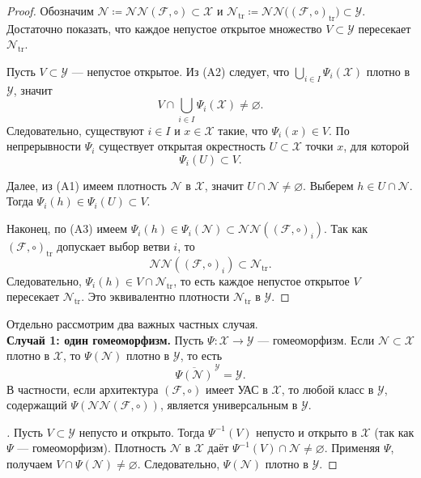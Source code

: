 \documentclass[../NDCNNAI_main.tex]{subfiles}
\begin{document}
\begin{proof}
Обозначим $\mathcal{N}\coloneq\mathcal{NN}(\mathcal{F},\circ)\subset\mathcal{X}$ и
$\mathcal{N}_{\mathrm{tr}}\coloneq\mathcal{NN}\bigl((\mathcal{F},\circ)_{\mathrm{tr}}\bigr)\subset\mathcal{Y}$.
Достаточно показать, что каждое непустое открытое множество $V\subset\mathcal{Y}$
пересекает $\mathcal{N}_{\mathrm{tr}}$.

Пусть $V\subset\mathcal{Y}$ --- непустое открытое. Из (A2) следует, что
$\bigcup_{i\in I}\Psi_i(\mathcal{X})$ плотно в $\mathcal{Y}$, значит
\[
V\cap \bigcup_{i\in I}\Psi_i(\mathcal{X})\neq\varnothing.
\]
Следовательно, существуют $i\in I$ и $x\in\mathcal{X}$ такие, что $\Psi_i(x)\in V$.
По непрерывности $\Psi_i$ существует открытая окрестность $U\subset\mathcal{X}$ точки $x$,
для которой
\[
\Psi_i(U)\subset V.
\]

Далее, из (A1) имеем плотность $\mathcal{N}$ в $\mathcal{X}$, значит $U\cap\mathcal{N}\neq\varnothing$.
Выберем $h\in U\cap\mathcal{N}$. Тогда $\Psi_i(h)\in \Psi_i(U)\subset V$.

Наконец, по (A3) имеем $\Psi_i(h)\in \Psi_i(\mathcal{N})\subset \mathcal{NN}((\mathcal{F},\circ)_i)$.
Так как $(\mathcal{F},\circ)_{\mathrm{tr}}$ допускает выбор ветви $i$, то
\[
\mathcal{NN}((\mathcal{F},\circ)_i)\subset \mathcal{N}_{\mathrm{tr}}.
\]
Следовательно, $\Psi_i(h)\in V\cap \mathcal{N}_{\mathrm{tr}}$, то есть каждое непустое открытое $V$
пересекает $\mathcal{N}_{\mathrm{tr}}$. Это эквивалентно плотности $\mathcal{N}_{\mathrm{tr}}$ в $\mathcal{Y}$.
\end{proof}

Отдельно рассмотрим два важных частных случая.\\
\textbf{Случай 1: один гомеоморфизм.}
Пусть $\Psi\colon \mathcal{X}\to\mathcal{Y}$ --- гомеоморфизм. Если $\mathcal{N}\subset\mathcal{X}$ плотно в $\mathcal{X}$,
то $\Psi(\mathcal{N})$ плотно в $\mathcal{Y}$, то есть
\[
\overline{\Psi(\mathcal{N})}^{\,\mathcal{Y}}=\mathcal{Y}.
\]
В частности, если архитектура $(\mathcal{F},\circ)$ имеет УАС в $\mathcal{X}$, то любой класс в $\mathcal{Y}$,
содержащий $\Psi(\mathcal{NN}(\mathcal{F},\circ))$, является универсальным в $\mathcal{Y}$.
\begin{proof}[]
Пусть $V\subset\mathcal{Y}$ непусто и открыто. Тогда $\Psi^{-1}(V)$ непусто и открыто в $\mathcal{X}$
(так как $\Psi$ --- гомеоморфизм). Плотность $\mathcal{N}$ в $\mathcal{X}$ даёт
$\Psi^{-1}(V)\cap \mathcal{N}\neq\varnothing$. Применяя $\Psi$, получаем
$V\cap \Psi(\mathcal{N})\neq\varnothing$. Следовательно, $\Psi(\mathcal{N})$ плотно в $\mathcal{Y}$.
\end{proof}
\end{document}
